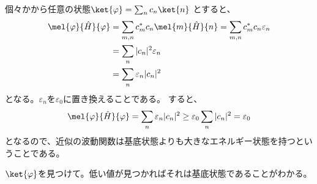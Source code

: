 \documentclass[titlepage]{ltjsarticle}
\begin{document}
個々かから任意の状態\(\ket{\varphi} = \sum_n c_n \ket{n}\)
とすると、
\begin{align}
  \mel{\varphi}{\hat{H}}{\varphi}  & = \sum_{m,n} c_m^* c_n \mel{m}{\hat{H}}{n} = \sum_{m,n} c_m^* c_n \varepsilon_n \\
  & = \sum_{n} |c_n|^2 \varepsilon_n \\
  & = \sum_n \varepsilon_n |c_n|^2
\end{align}
となる。\(\varepsilon_n\)を\(\varepsilon_0\)に置き換えることである。
すると、
\begin{equation}
  \mel{\varphi}{\hat{H}}{\varphi}  = \sum_n \varepsilon_n |c_n|^2 \ge \varepsilon_0 \sum_n |c_n|^2 = \varepsilon_0
\end{equation}
となるので、近似の波動関数は基底状態よりも大きなエネルギー状態を持つということである。


\(\ket{\varphi}\)を見つけて。低い値が見つかればそれは基底状態であることがわかる。



\end{document}
